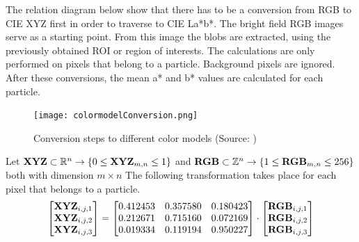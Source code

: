 \documentclass[11pt,fleqn,,a4paper,twoside,openright]{book}
\begin{document}
The relation diagram below show that there has to be a conversion from RGB to CIE XYZ first in order to traverse to CIE La*b*. The bright field RGB images serve as a starting point. From this image the blobs are extracted, using the previously obtained ROI or region of interests. The calculations are only performed on pixels that belong to a particle. Background pixels are ignored. After these conversions, the mean a* and b* values are calculated for each particle.

\begin{figure}[h]
	\centering
	\texttt{[image: colormodelConversion.png]}
	\caption{Conversion steps to different color models (Source: \citeauthor{viscarra_rossel_using_2008} \cite{viscarra_rossel_using_2008})}
	\label{fig:ConversionSteps}
\end{figure}

\begin{sBox}
	Let $\mat{XYZ} \subset \mathbb{R}^n \rightarrow \{0 \leq \mat{XYZ}_{m,n} \leq 1\} $ and $\mat{RGB} \subset \mathbb{Z}^n \rightarrow \{1 \leq \mat{RGB}_{m,n} \leq 256\} $ both with dimension $ m \times n $ The following transformation takes place for each pixel that belongs to a particle. 
	\begin{equation}
		\begin{bmatrix}
		\mat{XYZ}_{i,j,1} \\
		\mat{XYZ}_{i,j,2} \\
		\mat{XYZ}_{i,j,3} 
		\end{bmatrix}
		= \begin{bmatrix}
		0.412453 & 0.357580 & 0.180423 \\
		0.212671 & 0.715160 & 0.072169 \\
		0.019334 & 0.119194 & 0.950227
		\end{bmatrix}
		\cdot 
		\begin{bmatrix}
			\mat{RGB}_{i,j, 1} \\
			\mat{RGB}_{i,j, 2} \\
			\mat{RGB}_{i,j, 3} 
		\end{bmatrix}
	\end{equation}
\end{sBox}
\end{document}
